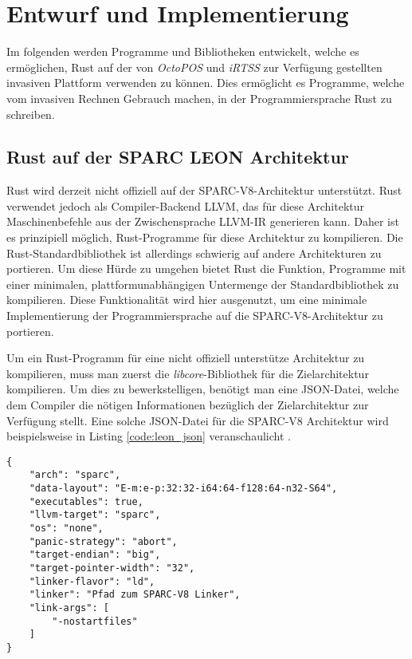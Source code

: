 \chapter{Entwurf und Implementierung}\label{sec:impl}

Im folgenden werden Programme und Bibliotheken entwickelt, welche es ermöglichen, Rust auf der von
\textit{OctoPOS} und \textit{iRTSS} zur Verfügung gestellten invasiven Plattform verwenden zu können.
Dies ermöglicht es Programme, welche vom invasiven Rechnen Gebrauch machen, in der
Programmiersprache Rust zu schreiben.

\section{Rust auf der SPARC LEON Architektur}\label{sec:rust_on_sparc}

Rust wird derzeit nicht offiziell auf der SPARC-V8-Architektur unterstützt. Rust verwendet jedoch als Compiler-Backend
LLVM, das für diese Architektur Maschinenbefehle aus der Zwischensprache LLVM-IR generieren kann.
Daher ist es prinzipiell möglich, Rust-Programme für diese Architektur zu kompilieren.
Die Rust-Standardbibliothek ist allerdings schwierig auf andere Architekturen zu portieren.
Um diese Hürde zu umgehen bietet Rust die Funktion,
Programme mit einer minimalen, plattformunabhängigen Untermenge der Standardbibliothek zu kompilieren.
Diese Funktionalität wird hier ausgenutzt,
um eine minimale Implementierung der Programmiersprache auf die SPARC-V8-Architektur zu portieren.

Um ein Rust-Programm für eine nicht offiziell unterstütze Architektur zu kompilieren,
muss man zuerst die \textit{libcore}-Bibliothek
für die Zielarchitektur kompilieren. Um dies zu bewerkstelligen, benötigt man eine JSON-Datei, welche
dem Compiler die nötigen Informationen bezüglich der Zielarchitektur zur Verfügung stellt.
Eine solche JSON-Datei für die
SPARC-V8 Architektur wird beispielsweise in Listing \ref{code:leon_json} veranschaulicht
\cite{initialSparcSupportGithub}.

\begin{lstlisting}[float,caption={
Eine beispielhafte JSON-Spezifikationsdatei für die SPARC-V8 Architektur
\cite{initialSparcSupportGithub.}
},label=code:leon_json]
{
    "arch": "sparc",
    "data-layout": "E-m:e-p:32:32-i64:64-f128:64-n32-S64",
    "executables": true,
    "llvm-target": "sparc",
    "os": "none",
    "panic-strategy": "abort",
    "target-endian": "big",
    "target-pointer-width": "32",
    "linker-flavor": "ld",
    "linker": "Pfad zum SPARC-V8 Linker",
    "link-args": [
        "-nostartfiles"
    ]
}
\end{lstlisting}

